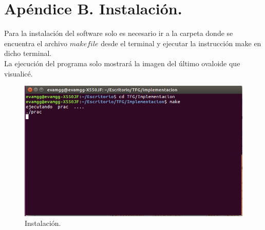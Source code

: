 \chapter{Apéndice B. Instalación.}

Para la instalación del software solo es necesario ir a la carpeta donde se encuentra el archivo $makefile$ desde el terminal y ejecutar la instrucción make en dicho terminal.
${ }$\\

La ejecución del programa solo mostrará la imagen del último ovaloide que visualicé.
${ }$\\

\begin{figure}[h]
	\begin{center}
		\includegraphics[width=1.0\textwidth]{imagenes/instalacion.png}
	\end{center}
	\caption{Instalación.}
	\label{fig:etiq_41}
\end{figure}